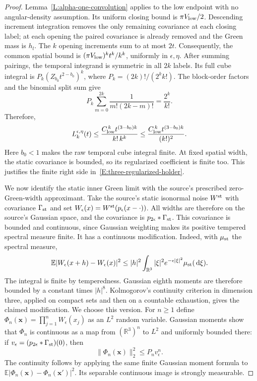 \documentclass[12pt]{article}
\numberwithin{equation}{section}
\theoremstyle{definition}
\newcommand{\R}{\mathbb{R}}
\newcommand{\E}{\mathbb{E}}
\newcommand{\ud}{\,\mathrm{d}}
\begin{document}
\begin{proof}
  Lemma~\ref{L:alpha-one-convolution} applies to the low endpoint
  with no angular-density assumption. Its uniform closing bound is
  $\pi V_{\rm low}/2$. Descending increment integration removes the
  only remaining covariance at each closing label; at each opening
  the paired covariance is already removed and the Green mass is $h_l$.
  The $k$ opening increments sum to at most $2t$. Consequently, the
  common spatial bound is $(\pi V_{\rm low})^kt^k/k^k$, uniformly in
  $\epsilon,\eta$. After summing pairings, the temporal integrand is
  symmetric in all $2k$ labels. Its full cube integral is
  $P_k(Z_{b_0}t^{2-b_0})^k$, where $P_k=(2k)!/(2^kk!)$.
  The block-order factors and the binomial split sum give
  \[
    P_k\sum_{m=0}^{2k}\frac1{m!(2k-m)!}=\frac{2^k}{k!}.
  \]
  Therefore,
  \begin{equation}\label{E:three-low-coefficient}
    L_k^{\epsilon,\eta}(t)
    \le\frac{C_{\rm low}^{\,k}t^{(3-b_0)k}}{k!\,k^k}
    \le\frac{C_{\rm low}^{\,k}t^{(3-b_0)k}}{(k!)^2}.
  \end{equation}
  Here $b_0<1$ makes the raw temporal cube integral finite. At fixed
  spatial width, the static covariance is bounded, so its regularized
  coefficient is finite too. This justifies the finite right side
  in~\eqref{E:three-regularized-holder}.

  We now identify the static inner Green limit with the source's
  prescribed zero-Green-width approximant. Take the source's static
  isonormal noise $W^{\rm st}$ with covariance $\Gamma_{\rm st}$ and set
  $W_\epsilon(x)=W^{\rm st}(p_\epsilon(x-\cdot))$.
  All widths are therefore on the source's Gaussian space, and the
  covariance is $p_{2\epsilon}*\Gamma_{\rm st}$.
  This covariance is bounded and
  continuous, since Gaussian weighting makes its positive tempered
  spectral measure finite. It has a continuous modification. Indeed,
  with $\mu_{\rm st}$ the spectral measure,
  \[
    \E|W_\epsilon(x+h)-W_\epsilon(x)|^2
    \le |h|^2\int_{\R^3}|\xi|^2e^{-\epsilon|\xi|^2}
    \mu_{\rm st}(\ud\xi).
  \]
  The integral is finite by temperedness. Gaussian eighth moments
  are therefore bounded by a constant times $|h|^8$.
  Kolmogorov's continuity criterion in dimension three, applied on
  compact sets and then on a countable exhaustion, gives the claimed
  modification. We choose this version.
  For $n\ge1$ define
  $\Phi_n(\mathbf{x})=\prod_{j=1}^n W_\epsilon(x_j)$ as an $L^2$
  random variable. Gaussian moments show that $\Phi_n$ is continuous
  as a map from $(\R^3)^n$ to $L^2$ and uniformly bounded there:
  if $v_\epsilon=(p_{2\epsilon}*\Gamma_{\rm st})(0)$, then
  \[
    \|\Phi_n(\mathbf{x})\|_2^2\le P_n v_\epsilon^n.
  \]
  The continuity follows by applying the same finite Gaussian moment
  formula to $\E|\Phi_n(\mathbf{x})-\Phi_n(\mathbf{x}')|^2$.
  Its separable continuous image is strongly measurable.


\end{proof}
\end{document}
